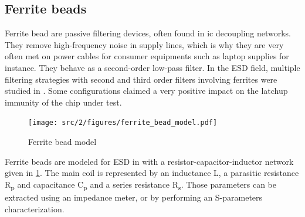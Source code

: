 \subsection{Ferrite beads}

Ferrite bead are passive filtering devices, often found in \gls{ic} decoupling networks.
They remove high-frequency noise in supply lines, which is why they are very often met on power cables for consumer equipments such as laptop supplies for instance.
They behave as a second-order low-pass filter.
In the ESD field, multiple filtering strategies with second and third order filters involving ferrites were studied in \cite{filter-strategies-esd}.
Some configurations claimed a very positive impact on the latchup immunity of the chip under test.

\begin{figure}[!h]
  \centering
  \texttt{[image: src/2/figures/ferrite\_bead\_model.pdf]}
  \caption{Ferrite bead model}
  \label{fig:ferrite-model}
\end{figure}

Ferrite beads are modeled for ESD in \cite{mixedModeESDSims} with a resistor-capacitor-inductor network given in \ref{fig:ferrite-model}.
The main coil is represented by an inductance L, a parasitic resistance R\textsubscript{p} and capacitance C\textsubscript{p} and a series resistance R\textsubscript{s}.
Those parameters can be extracted using an impedance meter, or by performing an S-parameters characterization.
